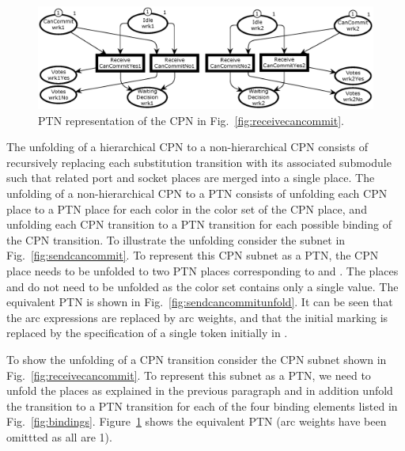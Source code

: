 \begin{figure}[t!!!!!]
\centering
\includegraphics[scale=.43]{figures/PTReceiveCanCommitBoth.eps}
\caption{PTN representation of the CPN in Fig.~\ref{fig:receivecancommit}.}
\label{fig:receivecancommitunfold}
\end{figure}


The unfolding of a hierarchical CPN to a non-hierarchical CPN consists
of recursively replacing each substitution transition with its
associated submodule such that related port and socket places are
merged into a single place. The unfolding of a non-hierarchical CPN to
a PTN consists of unfolding each CPN place to a PTN place for each
color in the color set of the CPN place, and unfolding each CPN
transition to a PTN transition for each possible binding of the CPN
transition.  To illustrate the unfolding consider the subnet in
Fig.~\ref{fig:sendcancommit}. To represent this CPN subnet as a PTN,
the CPN place  needs to be unfolded to two PTN
places corresponding to  and . The
places  and  do not need to be
unfolded as the  color set contains only a single
value. The equivalent PTN is shown in
Fig.~\ref{fig:sendcancommitunfold}. It can be seen that the arc
expressions are replaced by arc weights, and that the initial marking
is replaced by the specification of a single token initially in
.

To show the unfolding of a CPN transition consider the CPN subnet
shown in Fig.~\ref{fig:receivecancommit}. To represent this subnet as
a PTN, we need to unfold the places as explained in the previous
paragraph and in addition unfold the transition
 to a PTN transition for each of the four
binding elements listed in
Fig.~\ref{fig:bindings}. Figure~\ref{fig:receivecancommitunfold} shows
the equivalent PTN (arc weights have been omittted as all are 1).


